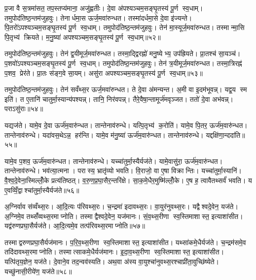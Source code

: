 प्र॒जा वै स॒त्रमा॑सत॒ तप॒स्तप्य॑माना॒ अजु॑ह्वतीः। दे॒वा अ॑पश्यञ्चम॒सङ्घृ॒तस्य॑ पू॒र्ण स्व॒धाम्। तमुपोद॑तिष्ठ॒न्तम॑जुहवुः। तेनार्धमा॒स ऊर्ज॒मवा॑रुन्धत। तस्मा॑दर्धमा॒से दे॒वा इ॑ज्यन्ते। पि॒तरो॑ऽपश्यञ्चम॒सङ्घृ॒तस्य॑ पू॒र्ण स्व॒धाम्। तमुपोद॑तिष्ठ॒न्तम॑जुहवुः। तेन॑ मा॒स्यूर्ज॒मवा॑रुन्धत। तस्मान्मा॒सि पि॒तृभ्य॑ क्रियते। म॒नु॒ष्या॑ अपश्यञ्चम॒सङ्घृ॒तस्य॑ पू॒र्ण स्व॒धाम्॥५२॥

तमुपोद॑तिष्ठ॒न्तम॑जुहवुः। तेन॑ द्व॒यीमूर्ज॒मवा॑रुन्धत। तस्मा॒द्द्विरह्नो॑ मनु॒ष्येभ्य॒ उप॑ह्रियते। प्रा॒तश्च॑ सा॒यञ्च॑। प॒शवो॑ऽपश्यञ्चम॒सङ्घृ॒तस्य॑ पू॒र्ण स्व॒धाम्। तमुपोद॑तिष्ठ॒न्तम॑जुहवुः। तेन॑ त्र॒यीमूर्ज॒मवा॑रुन्धत। तस्मा॒त्रिरह्न॑ प॒शव॒ प्रेर॑ते। प्रा॒तः स॑ङ्ग॒वे सा॒यम्। असु॑रा अपश्यञ्चम॒सङ्घृ॒तस्य॑ पू॒र्ण स्व॒धाम्॥५३॥

तमुपोद॑तिष्ठ॒न्तम॑जुहवुः। तेन॑ सवँथ्स॒र ऊर्ज॒मवा॑रुन्धत। ते दे॒वा अ॑मन्यन्त। अ॒मी वा इ॒दम॑भूवन्न्। यद्व॒य स्म इति॑। त ए॒तानि॑ चातुर्मा॒स्यान्य॑पश्यन्न्। तानि॒ निर॑वपन्न्। तैरे॒वैषा॒न्तामूर्ज॑मवृञ्जत। ततो॑ दे॒वा अभ॑वन्न्। पराऽसु॑राः॥५४॥

यद्यज॑ते। यामे॒व दे॒वा ऊर्ज॑म॒वारु॑न्धत। तान्तेनाव॑रुन्धे। यत्पि॒तृभ्य॑ क॒रोति॑। यामे॒व पि॒तर॒ ऊर्ज॑म॒वारु॑न्धत। तान्तेनाव॑रुन्धे। यदा॑वस॒थेऽन्न॒ हर॑न्ति। यामे॒व म॑नु॒ष्या॑ ऊर्ज॑म॒वारु॑न्धत। तान्तेनाव॑रुन्धे। यद्दक्षि॑णा॒न्ददा॑ति॥५५॥

यामे॒व प॒शव॒ ऊर्ज॑म॒वारु॑न्धत। तान्तेनाव॑रुन्धे। यच्चा॑तुर्मा॒स्यैर्यज॑ते। यामे॒वासु॑रा॒ ऊर्ज॑म॒वारु॑न्धत। तान्तेनाव॑रुन्धे। भव॑त्या॒त्मना। परास्य॒ भ्रातृ॑व्यो भवति। वि॒राजो॒ वा ए॒षा विक्रान्तिः। यच्चा॑तुर्मा॒स्यानि॑। वै॒श्व॒दे॒वेना॒स्मिल्लोँ॒के प्रत्य॑तिष्ठत्। व॒रु॒ण॒प्र॒घा॒सैर॒न्तरि॑क्षे। सा॒क॒मे॒धैर॒मुष्मि॑ल्लोँ॒के। ए॒ष ह॒ त्वावैतथ्सर्वं॑ भवति। य ए॒वव्विँ॒द्वाश्चा॑तुर्मा॒स्यैर्यज॑ते॥५६॥

अ॒ग्निर्वाव स॑व्वँथ्स॒रः। आ॒दि॒त्यः प॑रिवथ्स॒रः। च॒न्द्रमा॑ इदावथ्स॒रः। वा॒युर॑नुवथ्स॒रः। यद्वैश्वदे॒वेन॒ यज॑ते। अ॒ग्निमे॒व तथ्सँ॑व्वथ्स॒रमाप्नोति। तस्माद्वैश्वदे॒वेन॒ यज॑मानः। सं॒व॒थ्स॒रीणा स्व॒स्तिमाशास्त॒ इत्याशा॑सीत। यद्व॑रुणप्रघा॒सैर्यज॑ते। आ॒दि॒त्यमे॒व तत्प॑रिवथ्स॒रमाप्नोति॥५७॥

तस्माद्वरुणप्रघा॒सैर्यज॑मानः। प॒रि॒व॒थ्स॒रीणा स्व॒स्तिमाशास्त॒ इत्याशा॑सीत। यथ्सा॑कमे॒धैर्यज॑ते। च॒न्द्रम॑समे॒व तदि॑दावथ्स॒रमाप्नोति। तस्मात्साकमे॒धैर्यज॑मानः। इ॒दा॒व॒थ्स॒रीणा स्व॒स्तिमाशास्त॒ इत्याशा॑सीत। यत्पि॑तृय॒ज्ञेन॒ यज॑ते। दे॒वाने॒व तद॒न्वव॑स्यति। अथ॒वा अ॑स्य वा॒युश्चा॑नुवथ्स॒रश्चाप्री॑ता॒वुच्छि॑ष्येते। यच्छु॑नासी॒रीये॑ण॒ यज॑ते॥५८॥

